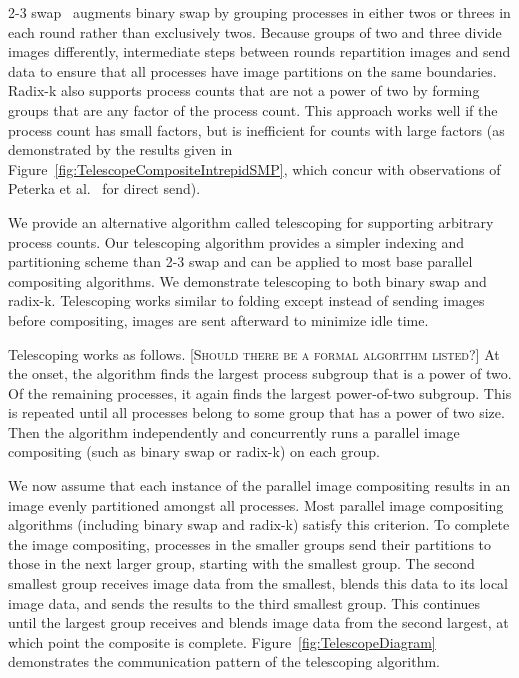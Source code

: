 \documentclass{acm_proc_article-sp}
\newcommand*{\lcite}[1]{~\cite{#1}}
\newcommand*{\scite}[1]{~\cite{#1}}
\newcommand{\etal}{et al.}
\newcommand{\sticky}[1]{{\color{red}\textsc{[#1]}}}
\begin{document}
2-3 swap\lcite{23Swap} augments binary swap by grouping processes in either
twos or threes in each round rather than exclusively twos.  Because groups
of two and three divide images differently, intermediate steps between
rounds repartition images and send data to ensure that all processes have
image partitions on the same boundaries.  Radix-k also supports process
counts that are not a power of two by forming groups that are any factor of
the process count.  This approach works well if the process count has small
factors, but is inefficient for counts with large factors (as demonstrated
by the results given in Figure~\ref{fig:TelescopeCompositeIntrepidSMP},
which concur with observations of Peterka \etal\scite{Peterka2009} for
direct send).

We provide an alternative algorithm called telescoping for supporting
arbitrary process counts.  Our telescoping algorithm provides a simpler
indexing and partitioning scheme than 2-3 swap and can be applied to most
base parallel compositing algorithms.  We demonstrate telescoping to both
binary swap and radix-k.  Telescoping works similar to folding except
instead of sending images before compositing, images are sent afterward to
minimize idle time.

Telescoping works as follows.  \sticky{Should there be a formal algorithm
  listed?}  At the onset, the algorithm finds the largest process subgroup
that is a power of two.  Of the remaining processes, it again finds the
largest power-of-two subgroup.  This is repeated until all processes belong
to some group that has a power of two size.  Then the algorithm
independently and concurrently runs a parallel image compositing (such as
binary swap or radix-k) on each group.

We now assume that each instance of the parallel image compositing results
in an image evenly partitioned amongst all processes.  Most parallel image
compositing algorithms (including binary swap and radix-k) satisfy this
criterion.  To complete the image compositing, processes in the smaller
groups send their partitions to those in the next larger group, starting
with the smallest group.  The second smallest group receives image data
from the smallest, blends this data to its local image data, and sends the
results to the third smallest group.  This continues until the largest
group receives and blends image data from the second largest, at which
point the composite is complete.  Figure~\ref{fig:TelescopeDiagram}
demonstrates the communication pattern of the telescoping algorithm.
\end{document}
